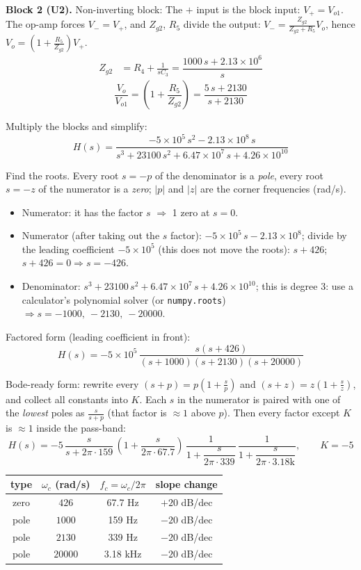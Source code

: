 \documentclass[11pt]{article}
\newcommand{\solstep}[2]{\par\medskip{\color{stepc}\textbf{Step #1 --- #2}}\par\nopagebreak}
\begin{document}
\textbf{Block 2 (U2).} Non-inverting block: The $+$ input is the block input: $V_+ = V_{o1}$. The op-amp forces $V_-=V_+$, and $Z_{g2}$, $R_{5}$ divide the output: $V_- = \frac{Z_{g2}}{Z_{g2} + R_{5}}V_{o}$, hence $V_{o} = \left(1+\frac{R_{5}}{Z_{g2}}\right)V_+$.\begin{align*}
Z_{g2} &= R_{4} + \frac{1}{sC_{3}} = \dfrac{1000\,s + 2.13\times 10^{6}}{s}
\end{align*}
\[
\frac{V_{o}}{V_{o1}} = \left(1+\frac{R_{5}}{Z_{g2}}\right) = \dfrac{5\,s + 2130}{s + 2130}
\]

Multiply the blocks and simplify:\[
H(s) = \dfrac{-5\times 10^{5}\,s^{2} - 2.13\times 10^{8}\,s}{s^{3} + 23100\,s^{2} + 6.47\times 10^{7}\,s + 4.26\times 10^{10}}
\]

\solstep{5}{Standard (Bode-ready) form}Find the roots. Every root $s=-p$ of the denominator is a \emph{pole}, every root $s=-z$ of the numerator is a \emph{zero}; $|p|$ and $|z|$ are the corner frequencies (rad/s).
\begin{itemize}[leftmargin=*,itemsep=2pt]
\item Numerator: it has the factor $s$ $\Rightarrow$ 1 zero at $s=0$.
\item Numerator (after taking out the $s$ factor): $-5\times 10^{5}\,s - 2.13\times 10^{8}$; divide by the leading coefficient $-5\times 10^{5}$ (this does not move the roots): $s + 426$; $s + 426 = 0 \Rightarrow s = -426$.
\item Denominator: $s^{3} + 23100\,s^{2} + 6.47\times 10^{7}\,s + 4.26\times 10^{10}$; this is degree 3: use a calculator's polynomial solver (or \texttt{numpy.roots}) $\Rightarrow s = -1000,\ -2130,\ -20000$.
\end{itemize}

Factored form (leading coefficient in front):
\[
H(s) = -5\times 10^{5}\,\dfrac{s(s+426)}{(s+1000)(s+2130)(s+20000)}
\]

Bode-ready form: rewrite every $(s+p) = p\left(1+\frac{s}{p}\right)$ and $(s+z) = z\left(1+\frac{s}{z}\right)$, and collect all constants into $K$. Each $s$ in the numerator is paired with one of the \emph{lowest} poles as $\frac{s}{s+p}$ (that factor is $\approx 1$ above $p$). Then every factor except $K$ is $\approx 1$ inside the pass-band:
\[
H(s) = -5\,\dfrac{s}{s+2\pi\cdot 159}\,\left(1+\dfrac{s}{2\pi\cdot 67.7}\right)\,\dfrac{1}{1+\dfrac{s}{2\pi\cdot 339}}\,\dfrac{1}{1+\dfrac{s}{2\pi\cdot 3.18\mathrm{k}}},\qquad K = -5
\]

\begin{center}\renewcommand{\arraystretch}{1.35}
\begin{tabular}{cccc}
\toprule
type & $\omega_c$ (rad/s) & $f_c=\omega_c/2\pi$ & slope change \\
\midrule
zero & $426$ & 67.7 Hz & $+20$ dB/dec \\
pole & $1000$ & 159 Hz & $-20$ dB/dec \\
pole & $2130$ & 339 Hz & $-20$ dB/dec \\
pole & $20000$ & 3.18 kHz & $-20$ dB/dec \\
\bottomrule
\end{tabular}\end{center}
\end{document}
